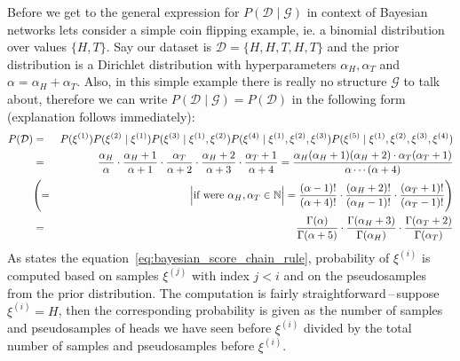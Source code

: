 \documentclass[english,cover]{fitthesis} %
\begin{document}
Before we get to the general expression for $P(\mathcal{D} \mid \mathcal{G})$ in context of Bayesian networks lets consider a simple coin flipping example, ie. a binomial distribution over values $\lbrace H, T \rbrace$. Say our dataset is $\mathcal{D} = \lbrace H,H,T,H,T\rbrace$ and the prior distribution is a Dirichlet distribution with hyperparameters $\alpha_H, \alpha_T$ and $\alpha = \alpha_H + \alpha_T$. Also, in this simple example there is really no structure $\mathcal{G}$ to talk about, therefore we can write $P(\mathcal{D} \mid \mathcal{G}) = P(\mathcal{D})$ in the following form (explanation follows immediately):
\begin{eqnarray*}
    P(\mathcal{D})
     & = & P(\xi^{(1)})
           P(\xi^{(2)} \mid \xi^{(1)})
           P(\xi^{(3)} \mid \xi^{(1)},\xi^{(2)})
           P(\xi^{(4)} \mid \xi^{(1)},\xi^{(2)},\xi^{(3)})
           P(\xi^{(5)} \mid \xi^{(1)},\xi^{(2)},\xi^{(3)},\xi^{(4)}) \\
     & = & \frac{\alpha_H}{\alpha} \cdot
           \frac{\alpha_H + 1}{\alpha + 1} \cdot
           \frac{\alpha_T}{\alpha + 2} \cdot
           \frac{\alpha_H + 2}{\alpha + 3} \cdot
           \frac{\alpha_T + 1}{\alpha + 4}
       =   \frac{\alpha_H (\alpha_H + 1) (\alpha_H + 2) \cdot \alpha_T (\alpha_T + 1)}{\alpha \dotsm (\alpha + 4)}\\
     & \Biggl( = & \Bigl \lvert \text{if were } \alpha_H, \alpha_T \in \mathbb{N} \Bigr \rvert = \frac{(\alpha - 1)!}{(\alpha + 4)!} \cdot \frac{(\alpha_H + 2)!}{(\alpha_H - 1)!} \cdot \frac{(\alpha_T + 1)!}{(\alpha_T - 1)!} \Biggr) \\
     & = & \frac{\Gamma(\alpha)}{\Gamma(\alpha + 5)} \cdot \frac{\Gamma(\alpha_H + 3)}{\Gamma(\alpha_H)} \cdot \frac{\Gamma(\alpha_T + 2)}{\Gamma(\alpha_T)}
\end{eqnarray*}
As states the equation~\eqref{eq:bayesian_score_chain_rule}, probability of $\xi^{(i)}$ is computed based on samples $\xi^{(j)}$ with index $j < i$ and on the pseudosamples from the prior distribution. The computation is fairly straightforward\,--\,suppose $\xi^{(i)} = H$, then the corresponding probability is given as the number of samples and pseudosamples of heads we have seen before $\xi^{(i)}$ divided by the total number of samples and pseudosamples before $\xi^{(i)}$.
\end{document}
